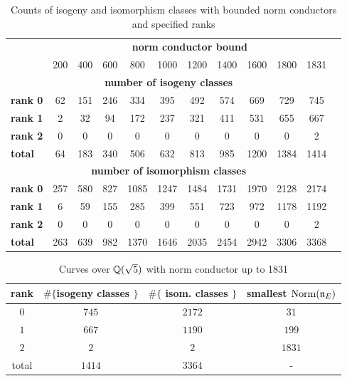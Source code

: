 \documentclass{amsart}
\newcommand{\n}{\mathfrak{n}}
\begin{document}
\begin{center}
\begin{table}[h]
\caption{Counts of isogeny and isomorphism classes with bounded norm conductors and specified ranks\label{table:increasing-counts}}
\begin{tabular}{l|c|c|c|c|c|c|c|c|c|c|c|} \cline{2-11}
&\multicolumn{10}{|c|}{\textbf{norm conductor bound}} \\\cline{2-11}
& 200 & 400 & 600 & 800 & 1000 & 1200 & 1400 & 1600 & 1800 & 1831\\\hline\hline
\multicolumn{11}{|c|}{\textbf{number of isogeny classes }} \\\hline
\multicolumn{1}{|l|}{\textbf{rank 0}} & 62 & 151 & 246 & 334 & 395 & 492 & 574 & 669 & 729 & 745 \\\hline
\multicolumn{1}{|l|}{\textbf{rank 1}} & 2 & 32 & 94 & 172 & 237 & 321 & 411 & 531 & 655 & 667 \\\hline
\multicolumn{1}{|l|}{\textbf{rank 2}} & 0 & 0 & 0 & 0 & 0 & 0 & 0 & 0 & 0 & 2 \\\hline
\multicolumn{1}{|l|}{\textbf{total}} & 64 & 183 & 340 & 506 & 632 & 813 & 985 & 1200 & 1384 & 1414 \\\hline\hline
\multicolumn{11}{|c|}{\textbf{number of isomorphism classes}} \\\hline
\multicolumn{1}{|l|}{\textbf{rank 0}} & 257 & 580 & 827 & 1085 & 1247 & 1484 & 1731 & 1970 & 2128 & 2174 \\\hline
\multicolumn{1}{|l|}{\textbf{rank 1}} & 6 & 59 & 155 & 285 & 399 & 551 & 723 & 972 & 1178 & 1192 \\\hline
\multicolumn{1}{|l|}{\textbf{rank 2}} & 0 & 0 & 0 & 0 & 0 & 0 & 0 & 0 & 0 & 2 \\\hline
\multicolumn{1}{|l|}{\textbf{total}} & 263 & 639 & 982 & 1370 & 1646 & 2035 & 2454 & 2942 & 3306 & 3368 \\\hline
\end{tabular}
\end{table}

\begin{table}
\caption{Curves over $\mathbb{Q}(\sqrt{5})$ with norm conductor up to 1831\label{table:total-counts}}
\begin{tabular}{|c|c|c|c|}\hline
{\bf rank} & $\#\{${\bf isogeny classes }$\}$ &  $\#\{$ {\bf isom. classes }$\}$ &{\bf smallest $\Norm(\n_E)$} \\\hline
 $0$  & $745$  & $2172$ & $31$\\\hline
 $1$  & $667$  & $1190$ & $199$ \\\hline
 $2$  & $2$    & $2$    & $1831$ \\\hline
total & $1414$ & $3364$ & - \\\hline
\end{tabular}
\end{table}
\end{center}
\end{document}
